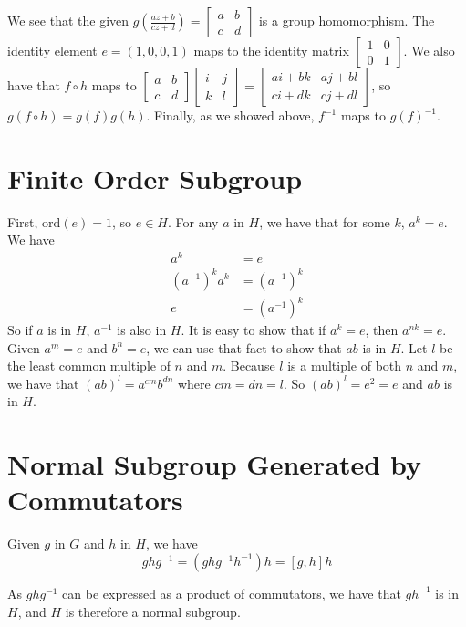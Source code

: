 \documentclass[12pt]{article}
\newcommand*{\ord}{\mathrm{ord}}
\newcommand*{\inv}{^{-1}}
\begin{document}
We see that the given $g(\frac{az + b}{cz + d}) = \begin{bmatrix} a & b\\ c & d \end{bmatrix}$ is a group homomorphism. The identity element $e = (1,0,0,1)$ maps to the identity matrix $\begin{bmatrix} 1 & 0\\ 0 & 1 \end{bmatrix}$. We also have that $f \circ h$ maps to $\begin{bmatrix} a & b\\ c & d \end{bmatrix}\begin{bmatrix} i & j\\ k & l \end{bmatrix} = \begin{bmatrix} ai + bk & aj + bl\\ ci + dk & cj + dl \end{bmatrix}$, so $g(f \circ h) = g(f)g(h)$. Finally, as we showed above, $f\inv$ maps to $g(f)\inv$.

\section{Finite Order Subgroup}
First, $\ord(e) = 1$, so $e \in H$. For any $a$ in $H$, we have that for some $k$, $a^k = e$. We have
\begin{align*}
a^k &= e\\
(a\inv)^k a^k &= (a\inv)^k\\
e &= (a\inv)^k
\end{align*}
So if $a$ is in $H$, $a\inv$ is also in $H$. It is easy to show that if $a^k = e$, then $a^{nk} = e$. Given $a^m = e$ and $b^n = e$, we can use that fact to show that $ab$ is in $H$. Let $l$ be the least common multiple of $n$ and $m$. Because $l$ is a multiple of both $n$ and $m$, we have that $(ab)^l = a^{cm}b^{dn}$ where $cm = dn = l$. So $(ab)^l = e^2 = e$ and $ab$ is in $H$.


\section{Normal Subgroup Generated by Commutators}
Given $g$ in $G$ and $h$ in $H$, we have
\[
g h g\inv = (g h g\inv h \inv) h = [g, h] h
\]

As $g h g\inv$ can be expressed as a product of commutators, we have that $g h \inv$ is in $H$, and $H$ is therefore a normal subgroup.
\end{document}
